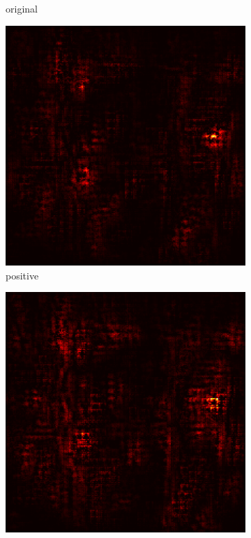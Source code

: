 \documentclass[preprint,12pt]{elsarticle}
\begin{document}
\begin{figure}
\begin{subfigure}{0.14\linewidth}
        \caption{original}
    \end{subfigure}
    \hfill
    \begin{subfigure}{0.14\textwidth}
        \centering
        \includegraphics[width=\linewidth]{../visualizations/examples/imagenette/cnn/positive_saliency_map/9.png}
        \caption{positive}
    \end{subfigure}
    \hfill
    \begin{subfigure}{0.14\textwidth}
        \centering
        \includegraphics[width=\linewidth]{../visualizations/examples/imagenette/cnn/negative_saliency_map/9.png}

\end{subfigure}
\end{figure}
\end{document}

